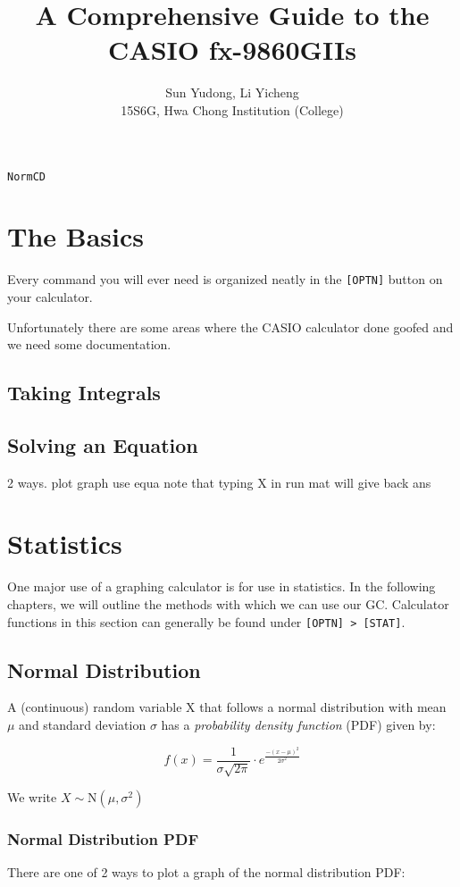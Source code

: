 \documentclass[a5paper]{memoir}
\title{A Comprehensive Guide to the CASIO fx-9860GIIs}
\author{Sun Yudong, Li Yicheng \\ 15S6G, Hwa Chong Institution (College)}
\def\code#1{\texttt{#1}}
\newcommand{\addtoindex}[1]{#1\index{#1}}
\begin{document}
\begin{titlingpage}\code{\addtoindex{NormCD}}
	\maketitle
\end{titlingpage}

\chapter{The Basics}
Every command you will ever need is organized neatly in the \code{[OPTN]} button on your calculator.

Unfortunately there are some areas where the CASIO calculator done goofed and we need some documentation.

\section{Taking Integrals}

\section{Solving an Equation}
2 ways.
plot graph
use equa
note that typing X in run mat will give back ans


\chapter{Statistics}
One major use of a graphing calculator is for use in statistics. In the following chapters, we will outline the methods with which we can use our GC. Calculator functions in this section can generally be found under \code{[OPTN] > [STAT]}.

\section{Normal Distribution}
A (continuous) random variable X that follows a normal distribution with mean $\mu$ and standard deviation $\sigma$ has a \textit{probability density function} (PDF) given by:

\begin{equation}
	f(x)=\frac{1}{\sigma\sqrt{2\pi}} \cdot e^{\frac{-(x-\mu)^2}{2\sigma^2}}
\end{equation}

We write $X \sim \mathrm{N} (\mu,\sigma^2)$

\subsection{Normal Distribution PDF}
There are one of 2 ways to plot a graph of the normal distribution PDF:
\end{document}
